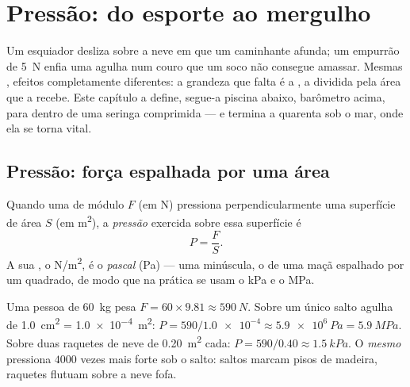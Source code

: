 \chapter{Pressão: do esporte ao mergulho}\label{ch:g10:pressure}

Um esquiador desliza sobre a neve em que um caminhante afunda; um
empurrão de \qty{5}{N} enfia uma agulha num couro que um soco não
consegue amassar. Mesmas , efeitos completamente diferentes: a
grandeza que falta é a \emph{}, a  dividida pela área que a
recebe. Este capítulo a define, segue-a piscina abaixo, barômetro acima,
para dentro de uma seringa comprimida --- e termina a quarenta 
sob o mar, onde ela se torna vital.

\section{Pressão: força espalhada por uma área}

\begin{definition}[Pressão]\label{def:g10:pressure:pressure}
Quando uma  de módulo $F$ (em \unit{N}) pressiona
perpendicularmente uma superfície de área $S$ (em \unit{m^2}), a
\emph{pressão} exercida sobre essa superfície é
\[
P = \frac{F}{S}.
\]
A sua , o \unit{N/m^2}, é o \emph{pascal}
(\unit{Pa}) --- uma  minúscula, o  de uma maçã espalhado por
um  quadrado, de modo que na prática se usam o \unit{kPa} e o
\unit{MPa}.
\end{definition}

\begin{example}\label{ex:g10:pressure:snowshoe}
Uma pessoa de \qty{60}{kg} pesa $F = 60 \times 9.81 \approx \qty{590}{N}$.
Sobre um único salto agulha de \qty{1.0}{cm^2} = \qty{1.0e-4}{m^2}:
$P = 590/\num{1.0e-4} \approx \qty{5.9e6}{Pa} = \qty{5.9}{MPa}$. Sobre
duas raquetes de neve de \qty{0.20}{m^2} cada:
$P = 590/0.40 \approx \qty{1.5}{kPa}$. O \emph{mesmo}  pressiona
$4000$ vezes mais forte sob o salto: saltos marcam pisos de madeira,
raquetes flutuam sobre a neve fofa.
\end{example}

